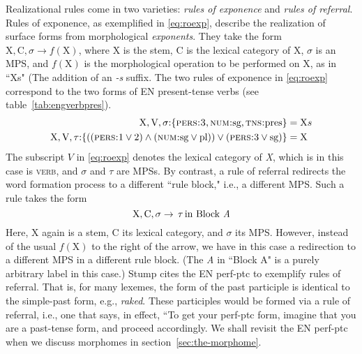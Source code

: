 Realizational rules come in two varieties:
\emph{rules of exponence} and \emph{rules of referral}. Rules of exponence, as exemplified in \eqref{eq:roexp}, describe the 
realization of surface forms from morphological \emph{exponents}. They take the form 
$\text{X},\text{C},\sigma \to f(\text{X})$, where X is the stem, C is the lexical category of X, 
$\sigma$ is an \ac{MPS},  and $f(\text{X})$ is the morphological operation to be performed 
on X, as in ``Xs" (The addition of an \emph{-s} suffix. The two rules of exponence in \eqref{eq:roexp}  
correspond to the two forms 
of \ac{EN} present-tense verbs (see table~\ref{tab:engverbpres}). 
\begin{align}
\label{eq:roexp}
	\text{X},\text{V},\sigma\text{:}\{ \textsc{pers:3}\text{,} \, \textsc{num:}\text{sg,} \, \textsc{tns:}\text{pres} \} &= \text{X}s \\ \label{eq:roexp1}
	\text{X},\text{V},\tau\text{:}\{((\textsc{pers:}\text{1}\vee\text{2}) \land (\textsc{num:}\text{sg}\vee\text{pl})) \vee (\textsc{pers:}3 \vee \text{sg})\} &= \text{X} 
\end{align}
The subscript $V$ in \eqref{eq:roexp} denotes the lexical category of \textit{X}, which is  
in this case is \textsc{verb}, 
and $\sigma$ and $\tau$ are \ac{MPS}s. 
By contrast, a rule of referral redirects the word formation process to a different ``rule block," i.e.,
a different \ac{MPS}. Such a rule takes the form 
\begin{equation}
\label{eq:ror}
\text{X}, \text{C}, \sigma \to \, \tau \, \text{in Block \textit{A}}
\end{equation}
Here, X again is a stem, 
C its lexical category, and $\sigma$ its MPS. However, instead of the usual $f(\text{X})$ 
to the right of the arrow, we have in this case a redirection to a 
different \ac{MPS} in a different rule block. (The \textit{A} in ``Block A" 
is a purely arbitrary label in this case.) Stump cites the \ac{EN} \ac{perf-ptc} 
to exemplify rules of referral. That is, for many lexemes, the form of the 
past participle is identical to the simple-past form, e.g., \textit{raked}. 
These participles would be formed via a rule of referral, i.e., one that 
says, in effect, ``To get your \ac{perf-ptc} form, imagine that you 
are a past-tense form, and proceed accordingly.  We shall revisit the \ac{EN} 
\ac{perf-ptc} when we discuss morphomes 
in section~\ref{sec:the-morphome}. 

%

